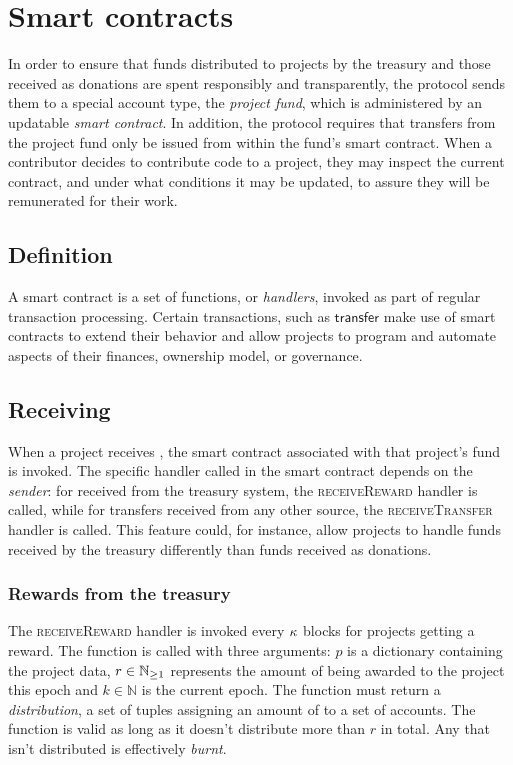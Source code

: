 \section{Smart contracts}
\label{s:smart-contracts}

\newcommand{\handler}[1]{\textsc{\small#1}}

In order to ensure that funds distributed to projects by the \oscoin{}
treasury and those received as donations are spent responsibly and
transparently, the \oscoin{} protocol sends them to a special account type, the
\emph{project fund}, which is administered by an updatable \emph{smart
contract}.
In addition, the protocol requires that transfers from the project fund only be
issued from within the fund's smart contract. When a contributor decides to
contribute code to a project, they may inspect the current contract,
and under what conditions it may be updated, to assure they will be
remunerated for their work.

\subsection{Definition}
A smart contract is a set of functions, or \emph{handlers}, invoked as part
of regular transaction processing. Certain transactions, such as $\mathsf{transfer}$
make use of smart contracts to extend their behavior and allow projects to
program and automate aspects of their finances, ownership model, or governance.

\subsection{Receiving \oscoin{}}

When a project receives \oscoin{}, the smart contract
associated with that project's fund is invoked. The specific handler
called in the smart contract depends on the \emph{sender}: for \oscoin{} received
from the treasury system, the \handler{receiveReward} handler is called, while
for transfers received from any other source, the \handler{receiveTransfer}
handler is called. This feature could, for instance, allow projects to handle funds received by the treasury
differently than funds received as donations.

\subsubsection{Rewards from the treasury}

The \handler{receiveReward} handler is invoked every $\kappa$ blocks for
projects getting a reward. The function is called with three arguments: $p$ is
a dictionary containing the project data, $r \in \mathbb{N}_{\geq 1}$ represents the amount
of \oscoin{} being awarded to the project this epoch and $k \in \mathbb{N}$ is the
current epoch. The function must return a \emph{distribution}, a set of tuples
assigning an amount of \oscoin{} to a set of accounts. The function is valid
as long as it doesn't distribute more than $r$ \oscoin{} in total. Any \oscoin{}
that isn't distributed is effectively \emph{burnt}.

